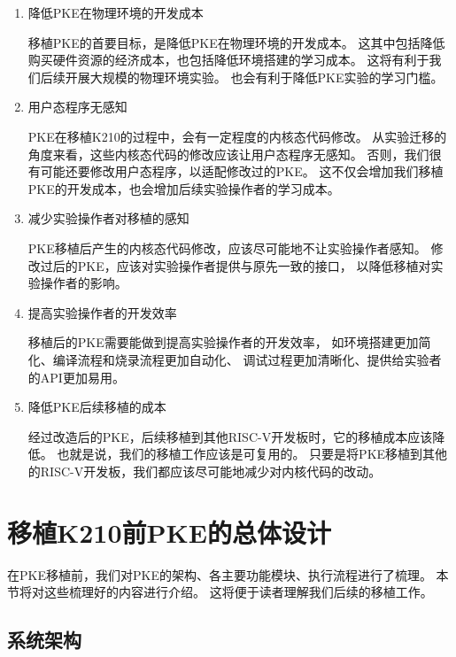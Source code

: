 \begin{enumerate}

    \item 降低PKE在物理环境的开发成本
    
    移植PKE的首要目标，是降低PKE在物理环境的开发成本。
    这其中包括降低购买硬件资源的经济成本，也包括降低环境搭建的学习成本。
    这将有利于我们后续开展大规模的物理环境实验。
    也会有利于降低PKE实验的学习门槛。

    \item 用户态程序无感知
    
    PKE在移植K210的过程中，会有一定程度的内核态代码修改。
    从实验迁移的角度来看，这些内核态代码的修改应该让用户态程序无感知。
    否则，我们很有可能还要修改用户态程序，以适配修改过的PKE。
    这不仅会增加我们移植PKE的开发成本，也会增加后续实验操作者的学习成本。

    \item 减少实验操作者对移植的感知
    
    PKE移植后产生的内核态代码修改，应该尽可能地不让实验操作者感知。
    修改过后的PKE，应该对实验操作者提供与原先一致的接口，
    以降低移植对实验操作者的影响。

    \item 提高实验操作者的开发效率
    
    移植后的PKE需要能做到提高实验操作者的开发效率，
    如环境搭建更加简化、编译流程和烧录流程更加自动化、
    调试过程更加清晰化、提供给实验者的API更加易用。
    
    \item 降低PKE后续移植的成本

    经过改造后的PKE，后续移植到其他RISC-V开发板时，它的移植成本应该降低。
    也就是说，我们的移植工作应该是可复用的。
    只要是将PKE移植到其他的RISC-V开发板，我们都应该尽可能地减少对内核代码的改动。
    
\end{enumerate}

\section{移植K210前PKE的总体设计}

在PKE移植前，我们对PKE的架构、各主要功能模块、执行流程进行了梳理。
本节将对这些梳理好的内容进行介绍。
这将便于读者理解我们后续的移植工作。

\subsection{系统架构}

